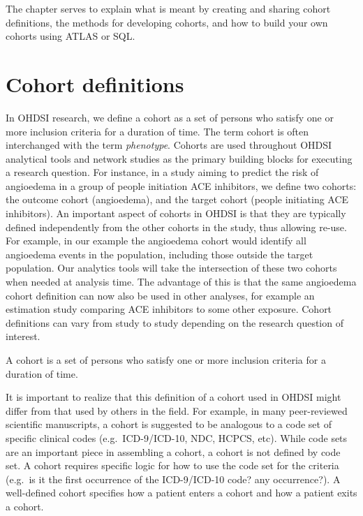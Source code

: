\documentclass[11pt]{book}
\theoremstyle{definition}
\theoremstyle{definition}
\theoremstyle{definition}
\theoremstyle{remark}
\let\BeginKnitrBlock\begin \let\EndKnitrBlock\end
\begin{document}
The chapter serves to explain what is meant by creating and sharing cohort definitions, the methods for developing cohorts, and how to build your own cohorts using ATLAS or SQL.

\hypertarget{cohort-definitions}{%
\section{Cohort definitions}\label{cohort-definitions}}

In OHDSI research, we define a cohort as a set of persons who satisfy one or more inclusion criteria for a duration of time. The term cohort is often interchanged with the term \emph{phenotype}. Cohorts are used throughout OHDSI analytical tools and network studies as the primary building blocks for executing a research question. For instance, in a study aiming to predict the risk of angioedema in a group of people initiation ACE inhibitors, we define two cohorts: the outcome cohort (angioedema), and the target cohort (people initiating ACE inhibitors). An important aspect of cohorts in OHDSI is that they are typically defined independently from the other cohorts in the study, thus allowing re-use. For example, in our example the angioedema cohort would identify all angioedema events in the population, including those outside the target population. Our analytics tools will take the intersection of these two cohorts when needed at analysis time. The advantage of this is that the same angioedema cohort definition can now also be used in other analyses, for example an estimation study comparing ACE inhibitors to some other exposure. Cohort definitions can vary from study to study depending on the research question of interest.

\BeginKnitrBlock{rmdimportant}
A cohort is a set of persons who satisfy one or more inclusion criteria for a duration of time.
\EndKnitrBlock{rmdimportant}

 
It is important to realize that this definition of a cohort used in OHDSI might differ from that used by others in the field. For example, in many peer-reviewed scientific manuscripts, a cohort is suggested to be analogous to a code set of specific clinical codes (e.g.~ICD-9/ICD-10, NDC, HCPCS, etc). While code sets are an important piece in assembling a cohort, a cohort is not defined by code set. A cohort requires specific logic for how to use the code set for the criteria (e.g.~is it the first occurrence of the ICD-9/ICD-10 code? any occurrence?). A well-defined cohort specifies how a patient enters a cohort and how a patient exits a cohort.
\end{document}
